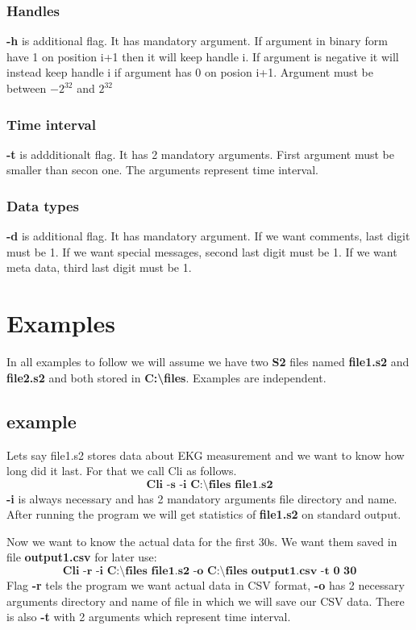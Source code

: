 \documentclass[english]{article}
\begin{document}
\subsubsection{Handles}
 \textbf{-h} is additional flag. It has mandatory argument. If argument in binary form have 1 on position i+1 then it will keep handle i. If argument is negative it will instead keep handle i if argument has 0 on posion i+1. Argument must be between $-2^{32}$ and $2^{32}$

\subsubsection{Time interval}
\textbf{-t} is addditionalt flag. It has 2 mandatory arguments. First argument must be smaller than secon one. The arguments represent time interval. 

\subsubsection{Data types}
\textbf{-d} is additional flag. It has mandatory argument. If we want comments, last digit must be 1. If we want special messages, second last digit must be 1. If we want meta data, third last digit must be 1.

\section{Examples}

In all examples to follow we will assume we have two \textbf{S2} files named \textbf{file1.s2} and \textbf{file2.s2} and both stored in \textbf{C:\textbackslash files}. Examples are independent.


\subsection{example}
Lets say file1.s2 stores data about EKG measurement and we want to know how long did it last. For that we call Cli as follows. $$\textbf{Cli -s -i C:\textbackslash files file1.s2} $$
 \textbf{-i} is always necessary and has 2 mandatory arguments file directory and name. After running the program we will get statistics of \textbf{file1.s2} on standard output.

Now we want to know the actual data for the first 30s. We want them saved in file \textbf{output1.csv} for later use: $$ \textbf{Cli -r -i C:\textbackslash files file1.s2 -o C:\textbackslash files output1.csv -t 0 30} $$
Flag \textbf{-r} tels the program we want actual data in CSV format, \textbf{-o} has 2 necessary arguments directory and name of file in which we will save our CSV data. There is also \textbf{-t} with 2 arguments which represent time interval.
\end{document}
